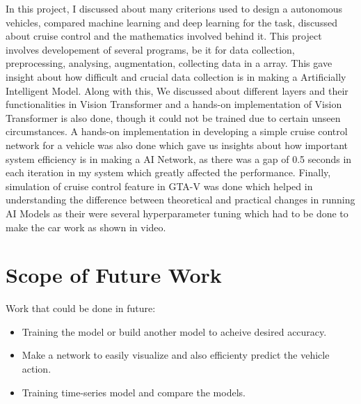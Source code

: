 In this project, I discussed about many criterions used to design a autonomous vehicles, compared machine learning and deep learning for the task, discussed about cruise control and the mathematics involved behind it. This project involves developement of several programs, be it for data collection, preprocessing, analysing, augmentation, collecting data in a array. This gave insight about how difficult and crucial data collection is in making a Artificially Intelligent Model. Along with this, We discussed about different layers and their functionalities in Vision Transformer and a hands-on implementation of Vision Transformer is also done, though it could not be trained due to certain unseen circumstances. A hands-on implementation in developing a simple cruise control network for a vehicle was also done which gave us insights about how important system efficiency is in making a AI Network, as there was a gap of 0.5 seconds in each iteration in my system which greatly affected the performance. Finally, simulation of cruise control feature in GTA-V was done which helped in understanding the difference between theoretical and practical changes in running AI Models as their were several hyperparameter tuning which had to be done to make the car work as shown in video.

\section{Scope of Future Work}
Work that could be done in future:
\begin{itemize}
    \item Training the model or build another model to acheive desired accuracy.
    \item Make a network to easily visualize and also efficienty predict the vehicle action.
    \item Training time-series model and compare the models. 
\end{itemize}